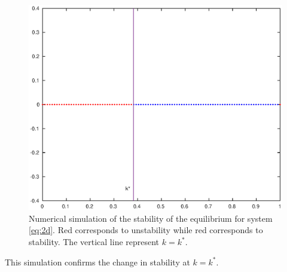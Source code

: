\documentclass{article}
\begin{document}
\begin{figure}[H]
\centering
\includegraphics[scale=0.5]{bifur.eps}
\caption{Numerical simulation of the stability of the equilibrium for system \ref{eq:2d}. Red corresponds to unstability while red corresponds to stability. The vertical line represent $k=k^{\ast}$.}
\label{fig:bifur}
\end{figure}

This simulation confirms the change in stability at $k=k^{\ast}$.
\end{document}
